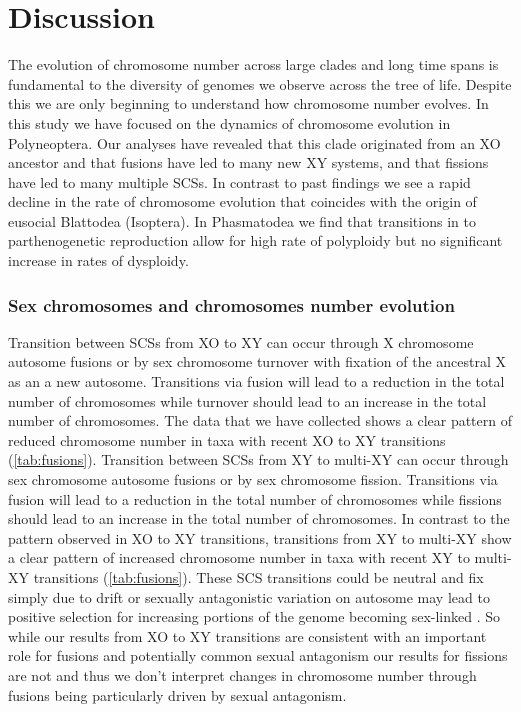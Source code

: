 \section{Discussion}

The evolution of chromosome number across large clades and long time spans is fundamental to the diversity of genomes we observe across the tree of life.
Despite this we are only beginning to understand how chromosome number evolves.
In this study we have focused on the dynamics of chromosome evolution in Polyneoptera. 
Our analyses have revealed that this clade originated from an XO ancestor and that fusions have led to many new XY systems, and that fissions have led to many multiple SCSs.
In contrast to past findings \citep{ross2015} we see a rapid decline in the rate of chromosome evolution that coincides with the origin of eusocial Blattodea (Isoptera).
In Phasmatodea we find that transitions in to parthenogenetic reproduction allow for high rate of polyploidy but no significant increase in rates of dysploidy.

\subsubsection{Sex chromosomes and chromosomes number evolution}
Transition between SCSs from XO to XY can occur through X chromosome autosome fusions or by sex chromosome turnover with fixation of the ancestral X as an a new autosome.
Transitions via fusion will lead to a reduction in the total number of chromosomes while turnover should lead to an increase in the total number of chromosomes.
The data that we have collected shows a clear pattern of reduced chromosome number in taxa with recent XO to XY transitions (\cref{tab:fusions}).
Transition between SCSs from XY to multi-XY can occur through sex chromosome autosome fusions or by sex chromosome fission.
Transitions via fusion will lead to a reduction in the total number of chromosomes while fissions should lead to an increase in the total number of chromosomes.
In contrast to the pattern observed in XO to XY transitions, transitions from XY to multi-XY show a clear pattern of increased chromosome number in taxa with recent XY to multi-XY transitions (\cref{tab:fusions}).
These SCS transitions could be neutral and fix simply due to drift or sexually antagonistic variation on autosome may lead to positive selection for increasing portions of the genome becoming sex-linked \citep{charlesworth1980, kitano2012}.
So while our results from XO to XY transitions are consistent with an important role for fusions and potentially common sexual antagonism our results for fissions are not and thus we don't interpret changes in chromosome number through fusions being particularly driven by sexual antagonism. 

